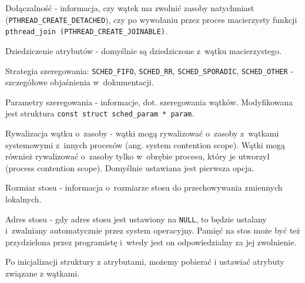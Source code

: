 \begin{myitemize}
\item Dołączalność - informacja, czy wątek ma zwolnić zasoby natychmiast (\lstinline[style=MyCStyle]{PTHREAD_CREATE_DETACHED}), czy po wywołaniu przez proces macierzysty funkcji \lstinline[style=MyCStyle]{pthread_join (PTHREAD_CREATE_JOINABLE)}.
\item Dziedziczenie atrybutów - domyślnie są dziedziczone z~wątku macierzystego. 
\item Strategia szeregowania: \lstinline[style=MyCStyle]{SCHED_FIFO}, \lstinline[style=MyCStyle]{SCHED_RR}, \lstinline[style=MyCStyle]{SCHED_SPORADIC}, \lstinline[style=MyCStyle]{SCHED_OTHER} - szczegółowe objaśnienia w~dokumentacji.
\item Parametry szeregowania - informacje, dot. szeregowania wątków. Modyfikowana jest struktura \lstinline[style=MyCStyle]{const struct sched_param * param}. 
\item Rywalizacja wątku o~zasoby - wątki mogą rywalizować o~zasoby z~wątkami systemowymi z~innych procesów (ang. system contention scope).  Wątki mogą również rywalizować o~zasoby tylko w~obrębie procesu, który je utworzył (process contention scope). Domyślnie ustawiana jest pierwsza opcja. 
\item Rozmiar stosu - informacja o~rozmiarze stosu do przechowywania zmiennych lokalnych. 
\item Adres stosu - gdy adres stosu jest ustawiony na \lstinline[style=MyCStyle]{NULL}, to będzie ustalany i~zwalniany automatycznie przez system operacyjny. Pamięć na stos może być też przydzielona przez programistę i~wtedy jest on odpowiedzialny za jej zwolnienie. 
\end{myitemize}

Po inicjalizacji struktury z atrybutami, możemy pobierać i ustawiać atrybuty związane z wątkami. 

